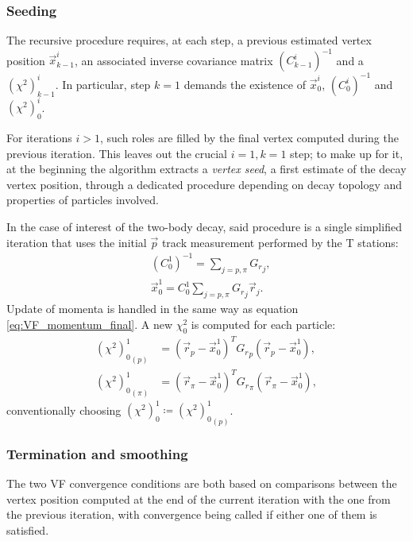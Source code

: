 \subsubsection{Seeding}
\label{sec:3:seeding}

The recursive procedure requires, at each step, a previous estimated vertex position $\vec{x}_{k-1}^i$, an associated inverse covariance matrix ${(C_{k-1}^i)}^{-1}$ and a ${(\chi^2)}_{k-1}^i$. In particular, step $k=1$ demands the existence of $\vec{x}_0^i$, ${(C_{0}^i)}^{-1}$ and ${(\chi^2)}_{0}^i$.

For iterations $i>1$, such roles are filled by the final vertex computed during the previous iteration.
This leaves out the crucial $i=1,k=1$ step;
to make up for it, at the beginning the algorithm extracts a \textit{vertex seed}, a first estimate of the decay vertex position, through a dedicated procedure depending on decay topology and properties of particles involved.

In the case of interest of the \lambdadecay two-body decay, said procedure is a single simplified iteration that uses the initial $\vec{p}$ track measurement performed by the T stations:
\begin{subequations}
\begin{align}
	&{(C_{0}^{1})}^{-1} = \sum_{j=p,\pi} {G_r}_j, \\
	&\vec{x}_0^1 = C_0^1 \sum_{j=p,\pi} {G_r}_j \vec{r}_j.
\end{align}
\end{subequations}
Update of momenta is handled in the same way as equation \eqref{eq:VF_momentum_final}.
A new $\chi^2_0$ is computed for each particle:
\begin{subequations}
\begin{align}
	{{(\chi^2)}_0^1}_{(p)} &= 
	{\left(\vec{r}_{p} - \vec{x}_0^1\right)}^T  {G_r}_p \left(\vec{r}_{p} - \vec{x}_0^1 \right), \\
	{{(\chi^2)}_0^1}_{(\pi)} &= 
	{\left(\vec{r}_{\pi} - \vec{x}_0^1\right)}^T  {G_r}_\pi \left(\vec{r}_{\pi} - \vec{x}_0^1 \right),
\end{align}
\end{subequations}
conventionally choosing ${(\chi^2)}_0^1 \coloneqq {{(\chi^2)}_0^1}_{(p)}$.

\subsubsection{Termination and smoothing}
The two VF convergence conditions are both based on comparisons between the vertex position computed at the end of the current iteration with the one from the previous iteration, with convergence being called if either one of them is satisfied.

